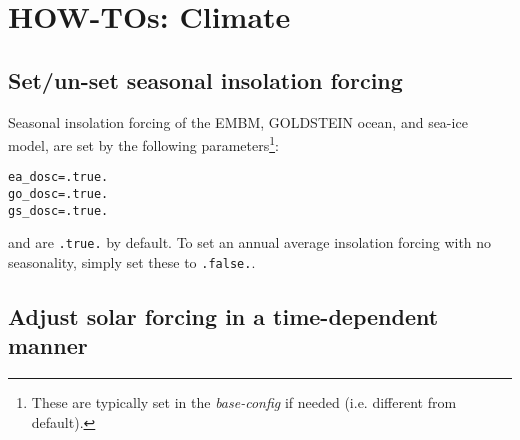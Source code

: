 \documentclass[10pt,twoside]{article}
\begin{document}

\newpage
\section{HOW-TOs: Climate}\label{how-to-3}


\subsection{Set/un-set seasonal insolation forcing}\label{how-to-3a}

Seasonal insolation forcing of the EMBM, GOLDSTEIN ocean, and sea-ice model, are set by the following parameters\footnote{These are typically set in the \textit{base-config} if needed (i.e. different from default).}:
\vspace{-10pt}\begin{verbatim}
ea_dosc=.true.
go_dosc=.true.
gs_dosc=.true.
\end{verbatim}\vspace{-5pt}
and are \texttt{.true.} by default.
To set an annual average insolation forcing with no seasonality, simply set these to \texttt{.false.}.


\subsection{Adjust solar forcing in a time-dependent manner}\label{Adjust solar forcing in a time-dependent manner}
\end{document}
